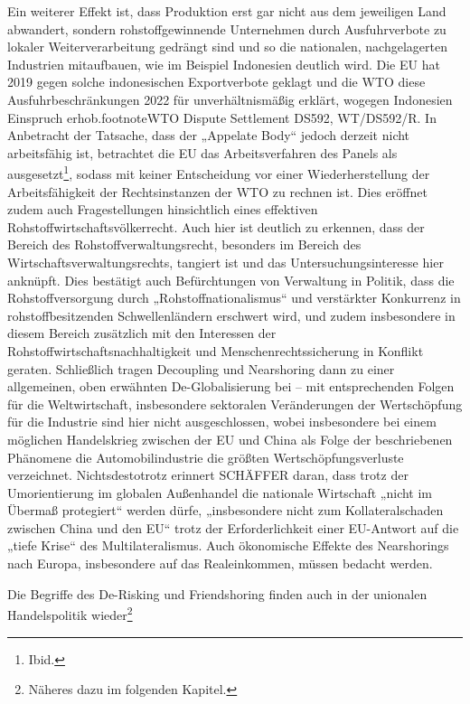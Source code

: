 \documentclass[12pt,a4paper,oneside]{book} %
\begin{document}
	Ein weiterer Effekt ist, dass Produktion erst gar nicht aus dem jeweiligen Land abwandert, sondern rohstoffgewinnende Unternehmen durch Ausfuhrverbote zu lokaler Weiterverarbeitung gedrängt sind und so die nationalen, nachgelagerten Industrien mitaufbauen, wie im Beispiel Indonesien deutlich wird. Die EU hat 2019 gegen solche indonesischen Exportverbote geklagt und die WTO diese Ausfuhrbeschränkungen 2022 für unverhältnismäßig erklärt, wogegen Indonesien Einspruch erhob.footnote{WTO Dispute Settlement DS592, WT/DS592/R.} In Anbetracht der Tatsache, dass der „Appelate Body“ jedoch derzeit nicht arbeitsfähig ist, betrachtet die EU das Arbeitsverfahren des Panels als ausgesetzt\footnote{Ibid.}, sodass mit keiner Entscheidung vor einer Wiederherstellung der Arbeitsfähigkeit der Rechtsinstanzen der WTO zu rechnen ist. Dies eröffnet zudem auch Fragestellungen hinsichtlich eines effektiven Rohstoffwirtschaftsvölkerrecht. Auch hier ist deutlich zu erkennen, dass der Bereich des Rohstoffverwaltungsrecht, besonders im Bereich des Wirtschaftsverwaltungsrechts, tangiert ist und das Untersuchungsinteresse hier anknüpft. Dies bestätigt auch Befürchtungen von Verwaltung in Politik, dass die Rohstoffversorgung durch „Rohstoffnationalismus“ und verstärkter Konkurrenz in rohstoffbesitzenden Schwellenländern erschwert wird, und zudem insbesondere in diesem Bereich zusätzlich mit den Interessen der Rohstoffwirtschaftsnachhaltigkeit und Menschenrechtssicherung in Konflikt geraten.\autocite{feichtner_besonderheit_2016} Schließlich tragen Decoupling und Nearshoring dann zu einer allgemeinen, oben erwähnten De-Globalisierung bei – mit entsprechenden Folgen für die Weltwirtschaft, insbesondere sektoralen Veränderungen der Wertschöpfung für die Industrie sind hier nicht ausgeschlossen, wobei insbesondere bei einem möglichen Handelskrieg zwischen der EU und China als Folge der beschriebenen Phänomene die Automobilindustrie die größten Wertschöpfungsverluste verzeichnet.\autocite[3]{fuest_geopolitische_2022} Nichtsdestotrotz erinnert SCHÄFFER daran, dass trotz der Umorientierung im globalen Außenhandel die nationale Wirtschaft „nicht im Übermaß protegiert“ werden dürfe, „insbesondere nicht zum Kollateralschaden zwischen China und den EU“ trotz der Erforderlichkeit einer EU-Antwort auf die „tiefe Krise“ des Multilateralismus.\autocite[700]{schaffer_ausenwirtschaftsrecht_2023} Auch ökonomische Effekte des Nearshorings nach Europa, insbesondere auf das Realeinkommen, müssen bedacht werden.\autocite{sandkamp_reshoring_2022}
	
	Die Begriffe des De-Risking und Friendshoring finden auch in der unionalen Handelspolitik wieder\footnote{Näheres dazu im folgenden Kapitel.}
	
\end{document}
